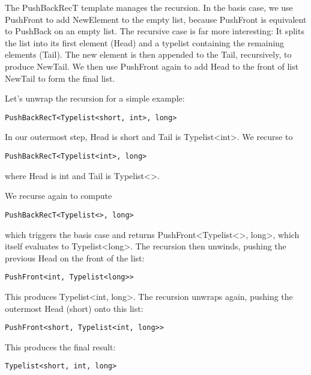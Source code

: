 The PushBackRecT template manages the recursion. In the basis case, we use PushFront to add NewElement to the empty list, because PushFront is equivalent to PushBack on an empty list. The recursive case is far more interesting: It splits the list into its first element (Head) and a typelist containing the remaining elements (Tail). The new element is then appended to the Tail, recursively, to produce NewTail. We then use PushFront again to add Head to the front of list NewTail to form the final list.

Let’s unwrap the recursion for a simple example:

\begin{lstlisting}[style=styleCXX]
PushBackRecT<Typelist<short, int>, long>
\end{lstlisting}

In our outermost step, Head is short and Tail is Typelist<int>. We recurse to

\begin{lstlisting}[style=styleCXX]
PushBackRecT<Typelist<int>, long>
\end{lstlisting}

where Head is int and Tail is Typelist<>.

We recurse again to compute

\begin{lstlisting}[style=styleCXX]
PushBackRecT<Typelist<>, long>
\end{lstlisting}

which triggers the basis case and returns PushFront<Typelist<>, long>, which itself evaluates to Typelist<long>. The recursion then unwinds, pushing the previous Head on the front of the list:

\begin{lstlisting}[style=styleCXX]
PushFront<int, Typelist<long>>
\end{lstlisting}

This produces Typelist<int, long>. The recursion unwraps again, pushing the outermost Head (short) onto this list:

\begin{lstlisting}[style=styleCXX]
PushFront<short, Typelist<int, long>>
\end{lstlisting}

This produces the final result:

\begin{lstlisting}[style=styleCXX]
Typelist<short, int, long>
\end{lstlisting}

